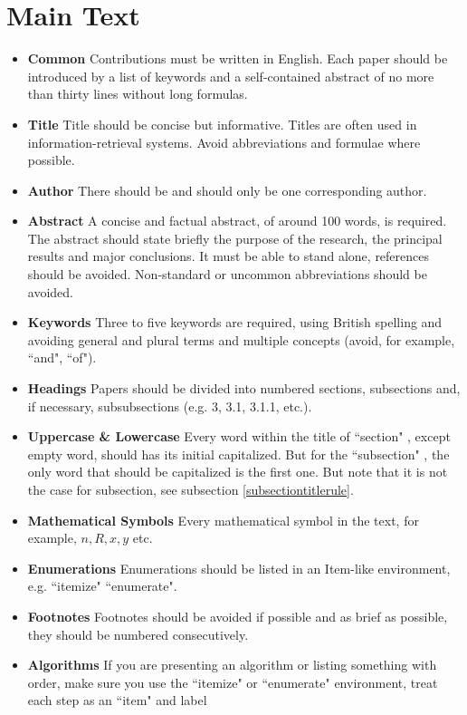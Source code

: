 \documentclass[print]{jicspack}
\begin{document}
\section{Main Text}
\label{Maintext}
\begin{itemize}
\item{\bf Common} Contributions must be written in English. Each
paper should be introduced by a list of keywords and a
self-contained abstract of no more than thirty lines without long
formulas. \item{\bf Title} Title should be concise but
informative. Titles are often used in information-retrieval
systems. Avoid abbreviations and formulae where possible.
\item{\bf Author} There should be and should only be one
corresponding author. \item{\bf Abstract} A concise and factual
abstract, of around 100 words, is required. The abstract should
state briefly the purpose of the research, the principal results
and major conclusions. It must be able to stand alone, references
should be avoided. Non-standard or uncommon abbreviations should
be avoided. \item{\bf Keywords} Three to five keywords are
required, using British spelling and avoiding general and plural
terms and multiple concepts (avoid, for example, ``and", ``of").
\item{\bf Headings} Papers should be divided into numbered
sections, subsections and, if necessary, subsubsections (e.g. 3,
3.1, 3.1.1, etc.). \item{\bf Uppercase \& Lowercase} Every word
within the title of ``section" , except empty word, should has its
initial capitalized. But for the ``subsection" , the only word
that should be capitalized is the first one. But note that it is
not the case for subsection, see subsection
\ref{subsectiontitlerule}. \item{\bf Mathematical Symbols} Every
mathematical symbol in the text, for example, $n, R, x, y$ etc.
\item{\bf Enumerations} Enumerations should be listed in an
Item-like environment, e.g. ``itemize" ``enumerate". \item{\bf
Footnotes} Footnotes should be avoided if possible and as brief as
possible, they should be numbered consecutively. \item{\bf
Algorithms} If you are presenting an algorithm or listing
something with order, make sure you use the ``itemize" or
``enumerate"  environment, treat each step as an ``item" and label

\end{itemize}
\end{document}

